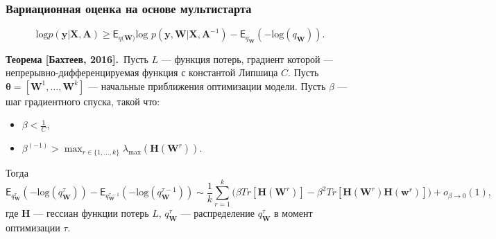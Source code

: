 \documentclass[usenames,dvipsnames,11pt,pdf,utf8,russian,aspectratio=169]{beamer}
\begin{document}
\begin{frame}
\frametitle{Вариационная оценка на основе мультистарта}
$$\text{log}p(\mathbf{y}|\mathbf{X}, \mathbf{A}) \geq \mathsf{E}_{q(\mathbf{W)}}\text{log~}p (\mathbf{y}, \mathbf{W}|\mathbf{X}, \mathbf{A}^{-1}) - \mathsf{E}_{q_{\mathbf{W}}}(-\text{log}(q_\mathbf{W})).$$

\textbf{Теорема [Бахтеев, 2016].}~Пусть $L$ --- функция потерь, градиент которой ---  непрерывно-дифференцируемая функция с константой Липшица $C$. Пусть $\boldsymbol{\theta} = [\mathbf{W}^1,\dots,\mathbf{W}^k]$ ---  начальные приближения оптимизации модели. Пусть $\beta$ --- шаг градиентного спуска, такой что:
\begin{itemize}
\item $\beta<\frac{1}{C}$,
\item $\beta^{(-1)} > \max_{r \in \{1,\dots,k\}}\lambda_\text{max} (\mathbf{H}(\mathbf{W}^r))$.
\end{itemize}
Тогда
\small
\[
	\mathsf{E}_{q^{\tau}_{\mathbf{W}}}(-\text{log}(q^{\tau}_\mathbf{W})) -  \mathsf{E}_{q^{\tau-1}_{\mathbf{W}}}(-\text{log}(q^{\tau-1}_\mathbf{W}))  \sim  \frac{1}{k}\sum_{r=1}^k \bigl(\beta Tr[\mathbf{H}(\mathbf{W}^r)] - \beta^2 Tr[\mathbf{H}(\mathbf{W}^r)\mathbf{H}(\mathbf{w}^r)]  \bigr) + o_{\beta \to 0}(1),
\]
где $\mathbf{H}$ --- гессиан функции потерь $L$, $q^{\tau}_\mathbf{W}$ --- распределение $q^{\tau}_\mathbf{W}$ в момент оптимизации $\tau$.
\end{frame}
\end{document}
